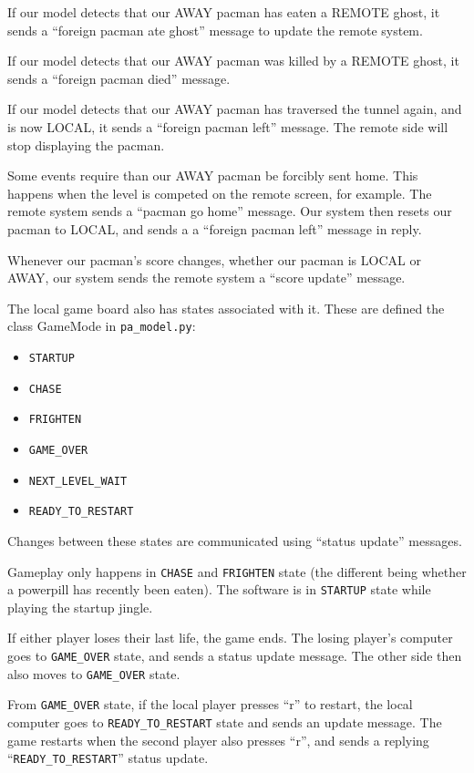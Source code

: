 \documentclass{article}
\begin{document}
If our model detects that our AWAY pacman has eaten a REMOTE ghost,
it sends a ``foreign pacman ate ghost'' message to update the remote
system.

If our model detects that our AWAY pacman was killed by a REMOTE
ghost, it sends a ``foreign pacman died'' message.

If our model detects that our AWAY pacman has traversed the tunnel
again, and is now LOCAL, it sends a ``foreign pacman left'' message.
The remote side will stop displaying the pacman.

Some events require than our AWAY pacman be forcibly sent home.  This
happens when the level is competed on the remote screen, for example.
The remote system sends a ``pacman go home'' message.  Our system then
resets our pacman to LOCAL, and sends a a ``foreign pacman left''
message in reply.

Whenever our pacman's score changes, whether our pacman is LOCAL
or AWAY, our system sends the remote system a ``score update''
message.

The local game board also has states associated with it.  These are defined the class GameMode in {\tt pa\_model.py}:

\begin{itemize}
\item {\tt STARTUP}
\item {\tt CHASE}
\item {\tt FRIGHTEN}
\item {\tt GAME\_OVER}
\item {\tt NEXT\_LEVEL\_WAIT}
\item {\tt READY\_TO\_RESTART}
\end{itemize}

Changes between these states are communicated using ``status update'' messages.

Gameplay only happens in {\tt CHASE} and {\tt FRIGHTEN} state (the different being
whether a powerpill has recently been eaten).  The software is in
{\tt STARTUP} state while playing the startup jingle.

If either player loses their last life, the game ends.  The losing
player's computer goes to {\tt GAME\_OVER} state, and sends a status update
message.  The other side then also moves to {\tt GAME\_OVER} state.

From {\tt GAME\_OVER} state, if the local player presses ``r'' to restart,
the local computer goes to {\tt READY\_TO\_RESTART} state and sends an update
message.  The game restarts when the second player also presses ``r'',
and sends a replying ``{\tt READY\_TO\_RESTART}'' status update.
\end{document}
